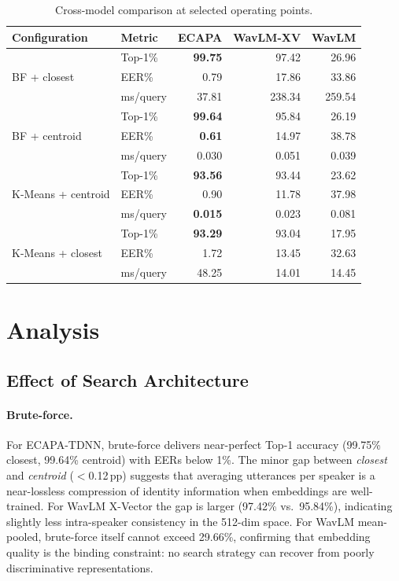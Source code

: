\documentclass[12pt, a4paper]{article}
\begin{document}
\begin{table}[H]
\centering
\caption{Cross-model comparison at selected operating points.}
\label{tab:crossmodel}
\setlength{\tabcolsep}{4pt}
\begin{tabular}{llrrr}
\toprule
\textbf{Configuration} & \textbf{Metric} &
\textbf{ECAPA} & \textbf{WavLM-XV} & \textbf{WavLM} \\
\midrule
\multirow{3}{*}{BF + closest}
  & Top-1\%  & \textbf{99.75} & 97.42  & 26.96  \\
  & EER\%    & 0.79  & 17.86  & 33.86  \\
  & ms/query & 37.81 & 238.34 & 259.54 \\
\midrule
\multirow{3}{*}{BF + centroid}
  & Top-1\%  & \textbf{99.64} & 95.84  & 26.19  \\
  & EER\%    & \textbf{0.61}  & 14.97  & 38.78  \\
  & ms/query & 0.030 & 0.051  & 0.039  \\
\midrule
\multirow{3}{*}{K-Means + centroid}
  & Top-1\%  & \textbf{93.56} & 93.44  & 23.62  \\
  & EER\%    & 0.90  & 11.78  & 37.98  \\
  & ms/query & \textbf{0.015} & 0.023  & 0.081  \\
\midrule
\multirow{3}{*}{K-Means + closest}
  & Top-1\%  & \textbf{93.29} & 93.04  & 17.95  \\
  & EER\%    & 1.72  & 13.45  & 32.63  \\
  & ms/query & 48.25 & 14.01  & 14.45  \\
\bottomrule
\end{tabular}
\end{table}

\section{Analysis}
\label{sec:analysis}

\subsection{Effect of Search Architecture}
\label{sec:analysis_arch}

\paragraph{Brute-force.}
For ECAPA-TDNN, brute-force delivers near-perfect Top-1 accuracy
(99.75\% closest, 99.64\% centroid) with EERs below 1\%.
The minor gap between \emph{closest} and \emph{centroid} ($<$0.12\,pp)
suggests that averaging utterances per speaker is a near-lossless
compression of identity information when embeddings are well-trained.
For WavLM X-Vector the gap is larger (97.42\% vs.\ 95.84\%),
indicating slightly less intra-speaker consistency in the 512-dim space.
For WavLM mean-pooled, brute-force itself cannot exceed 29.66\%,
confirming that embedding quality is the binding constraint: no search
strategy can recover from poorly discriminative representations.
\end{document}
